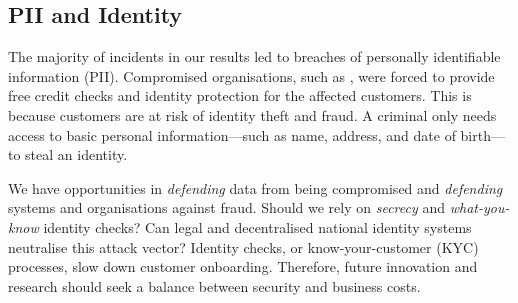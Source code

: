 \subsection{PII and Identity}
The majority of incidents in our results led to breaches of personally identifiable information (PII). Compromised organisations, such as \ha, were forced to provide free credit checks and identity protection for the affected customers. This is because customers are at risk of identity theft and fraud. A criminal only needs access to basic personal information—such as name, address, and date of birth—to steal an identity.

We have opportunities in \emph{defending} data from being compromised and \emph{defending} systems and organisations against fraud. Should we rely on \emph{secrecy} and \emph{what-you-know} identity checks? Can legal and decentralised national identity systems neutralise this attack vector? Identity checks, or know-your-customer (KYC) processes, slow down customer onboarding. Therefore, future innovation and research should seek a balance between security and business costs.

